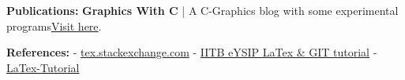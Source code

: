 \documentclass[11pt]{article}
\begin{document}
\begin{center}
\begin{minipage}[t]{0.36\textwidth}
			\raggedright
			\begin{LARGE}
				\textbf{Publications:}\linebreak\linebreak%
				{\small
				\textbf{Graphics With C} | A C-Graphics blog with some experimental programs\linebreak\href{https://graphicswithc.wordpress.com/}{Visit here}.
				}
			\end{LARGE}
		\end{minipage}%
		\begin{minipage}[t]{0.33333\textwidth}
			\raggedright
			\begin{LARGE}
				\textbf{References:}\linebreak\linebreak%
				{\small
					- \href{https://tex.stackexchange.com}{tex.stackexchange.com}\linebreak
					- \href{https://github.com/lohitpenu/Internship-eYSIP-2018}{IITB eYSIP LaTex \& GIT tutorial}\linebreak
					- \href{https://www.latex-tutorial.com}{LaTex-Tutorial}
				}
			\end{LARGE}
		\end{minipage}%
		\begin{minipage}[t]{0\textwidth}
			\raggedright
			\begin{LARGE}
				
			\end{LARGE}
		\end{minipage}%
	\end{center}
\end{document}
